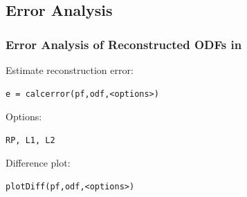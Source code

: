 \subsection*{Error Analysis}

\begin{frame}[fragile]
  \frametitle{Error Analysis of Reconstructed ODFs in  \MTEX}

Estimate reconstruction error:
\begin{lstlisting}
e = calcerror(pf,odf,<options>)
\end{lstlisting}

Options:
\begin{lstlisting}
RP, L1, L2
\end{lstlisting}

Difference plot:
\begin{lstlisting}
plotDiff(pf,odf,<options>)
\end{lstlisting}


\vspace{3mm}

\end{frame}








